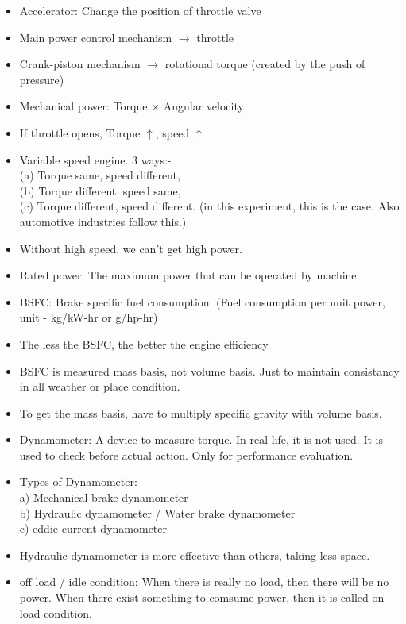 \documentclass{article}
\begin{document}
\begin{multicols}{2}
  \begin{itemize}
    \item Accelerator: Change the position of throttle valve 
    \item Main power control mechanism $\rightarrow$ throttle 
    \item Crank-piston mechanism $\rightarrow$ rotational torque (created by the push of pressure)
    \item Mechanical power: Torque $\times$ Angular velocity
    \item If throttle opens, Torque $\uparrow$, speed $\uparrow$ 
    \item Variable speed engine. 3 ways:-\\ 
    (a) Torque same, speed different,\\
    (b) Torque different, speed same,\\
    (c) Torque different, speed different. (in this experiment, this is the case. Also automotive industries follow this.)
    \item Without high speed, we can't get high power.
    \item Rated power: The maximum power that can be operated by machine. 
    \item BSFC: Brake specific fuel consumption. (Fuel consumption per unit power, unit - kg/kW-hr or g/hp-hr)
    \item The less the BSFC, the better the engine efficiency.
    \item BSFC is measured mass basis, not volume basis. Just to maintain consistancy in all weather or place condition. 
    \item To get the mass basis, have to multiply specific gravity with volume basis.
    \item Dynamometer: A device to measure torque. In real life, it is not used. It is used to check before actual action. Only for performance evaluation. 
    \item Types of Dynamometer:\\
    a) Mechanical brake dynamometer \\
    b) Hydraulic dynamometer / Water brake dynamometer \\
    c) eddie current dynamometer \\
    \item Hydraulic dynamometer is more effective than others, taking less space. 
    \item off load / idle condition: When there is really no load, then there will be no power. When there exist something to comsume power, then it is called on load condition.  

\end{itemize}
\end{multicols}
\end{document}
